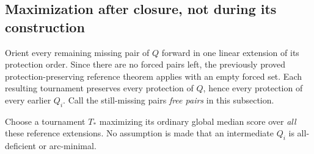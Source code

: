 \subsection{Maximization after closure, not during its construction}

Orient every remaining missing pair of $Q$ forward in one linear
extension of its protection order. Since there are no forced pairs left,
the previously proved protection-preserving reference theorem applies
with an empty forced set. Each resulting tournament preserves every
protection of $Q$, hence every protection of every earlier $Q_i$.
Call the still-missing pairs \emph{free pairs} in this subsection.

Choose a tournament $T_*$ maximizing its ordinary global median score
over \emph{all} these reference extensions. No assumption is made that
an intermediate $Q_i$ is all-deficient or arc-minimal.

